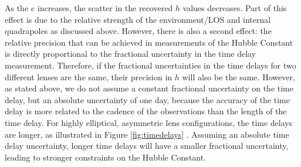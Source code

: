 As the $e$ increases, the scatter in the recovered $h$ values decreases. Part of this effect is due to the relative strength of the environment/LOS and internal quadrapoles as discussed above. However, there is also a second effect: the relative precision that can be achieved in measurements of the Hubble Constant is directly proportional to the fractional uncertainty in the time delay measurement. Therefore, if the fractional uncertainties in the time delays for two different lenses are the same, their precision in $h$ will also be the same. However, as stated above, we do not assume a constant fractional uncertainty on the time delay, but an absolute uncertainty of one day, because the accuracy of the time delay is more related to the cadence of the observations than the length of the time delay. For highly elliptical, asymmetric lens configurations, the time delays are longer, as illustrated in Figure \ref{fig:timedelays} \citep[see also][]{Witt00}. Assuming an absolute time delay uncertainty, longer time delays will have a smaller fractional uncertainty, leading to stronger constraints on the Hubble Constant.
  